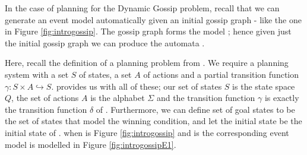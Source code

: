 \documentclass[10pt, a4paper]{report}
\begin{document}
In the case of planning for the Dynamic Gossip problem, recall that we can
generate an event model  automatically given an initial gossip graph -
like the one in Figure \ref{fig:introgossip}. The gossip graph forms the model
; hence given just the initial gossip graph we can produce the automata
\mestar.

Here, recall the definition of a planning problem from . We
require a planning system with a set $S$ of states, a set $A$ of actions and a
partial transition function $\gamma : S \times A \hookrightarrow S$. \mestar
provides us with all of these; our set of states $S$ is the state space $Q$, the
set of actions $A$ is the alphabet $\Sigma$ and the transition function $\gamma$
is exactly the transition function $\delta$ of \mestar. Furthermore, we can
define set of goal states to be the set of states that model the winning
condition, and let the initial state be the initial state of \mestar. \mestar
when  is Figure \ref{fig:introgossip} and  is the corresponding
event model is modelled in Figure \ref{fig:introgossipE1}.
\end{document}
